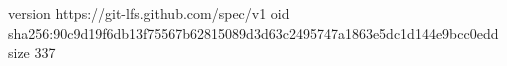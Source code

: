 version https://git-lfs.github.com/spec/v1
oid sha256:90c9d19f6db13f75567b62815089d3d63c2495747a1863e5dc1d144e9bcc0edd
size 337
